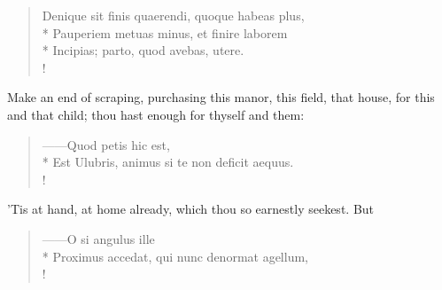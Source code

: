{\begin{latin}
\begin{verse}%
Denique sit finis quaerendi, quoque habeas plus,\\*
Pauperiem metuas minus, et finire laborem\\*
Incipias; parto, quod avebas, utere.\\!
\end{verse}%
\end{latin}

Make an end of scraping, purchasing this manor, this field, that house, for this and that child; thou hast enough for thyself and them:

\begin{latin}
\begin{verse}%
------Quod petis hic est,\\*
Est Ulubris, animus si te non deficit aequus.\\!
\end{verse}%
\end{latin}

'Tis at hand, at home already, which thou so earnestly seekest. But

\begin{latin}
\begin{verse}%
------O si angulus ille\\*
Proximus accedat, qui nunc denormat agellum,\\!
\end{verse}%
\end{latin}

}
